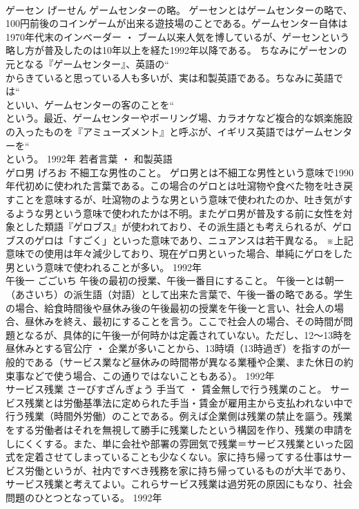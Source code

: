 \documentclass[8pt]{extreport}
\begin{document}
\begin{CJK}{UTF8}{min}
\\	ゲーセン	げーせん	ゲームセンターの略。	ゲーセンとはゲームセンターの略で、100円前後のコインゲームが出来る遊技場のことである。ゲームセンター自体は1970年代末のインベーダー ・ ブーム以来人気を博しているが、ゲーセンという略し方が普及したのは10年以上を経た1992年以降である。 ちなみにゲーセンの元となる『ゲームセンター』、英語の“
\\	からきていると思っている人も多いが、実は和製英語である。ちなみに英語では“
\\	といい、ゲームセンターの客のことを“
\\	という。最近、ゲームセンターやボーリング場、カラオケなど複合的な娯楽施設の入ったものを『アミューズメント』と呼ぶが、イギリス英語ではゲームセンターを“
\\	という。	1992年	若者言葉 ・ 和製英語	
\\	ゲロ男	げろお	不細工な男性のこと。	ゲロ男とは不細工な男性という意味で1990年代初めに使われた言葉である。この場合のゲロとは吐瀉物や食べた物を吐き戻すことを意味するが、吐瀉物のような男という意味で使われたのか、吐き気がするような男という意味で使われたかは不明。またゲロ男が普及する前に女性を対象とした類語『ゲロブス』が使われており、その派生語とも考えられるが、ゲロブスのゲロは「すごく」といった意味であり、ニュアンスは若干異なる。 ※上記意味での使用は年々減少しており、現在ゲロ男といった場合、単純にゲロをした男という意味で使われることが多い。	1992年	
\\	午後一	ごごいち	午後の最初の授業、午後一番目にすること。	午後一とは朝一（あさいち）の派生語（対語）として出来た言葉で、午後一番の略である。学生の場合、給食時間後や昼休み後の午後最初の授業を午後一と言い、社会人の場合、昼休みを終え、最初にすることを言う。ここで社会人の場合、その時間が問題となるが、具体的に午後一が何時かは定義されていない。ただし、12～13時を昼休みとする官公庁 ・ 企業が多いことから、13時頃（13時過ぎ）を指すのが一般的である（サービス業など昼休みの時間帯が異なる業種や企業、また休日の約束事などで使う場合、この通りではないこともある）。	1992年	
\\	サービス残業	さーびすざんぎょう	手当て ・ 賃金無しで行う残業のこと。	サービス残業とは労働基準法に定められた手当・賃金が雇用主から支払われない中で行う残業（時間外労働）のことである。例えば企業側は残業の禁止を謳う。残業をする労働者はそれを無視して勝手に残業したという構図を作り、残業の申請をしにくくする。また、単に会社や部署の雰囲気で残業＝サービス残業といった図式を定着させてしまっていることも少なくない。家に持ち帰ってする仕事はサービス労働というが、社内ですべき残務を家に持ち帰っているものが大半であり、サービス残業と考えてよい。これらサービス残業は過労死の原因にもなり、社会問題のひとつとなっている。	1992年	

\end{CJK}
\end{document}
